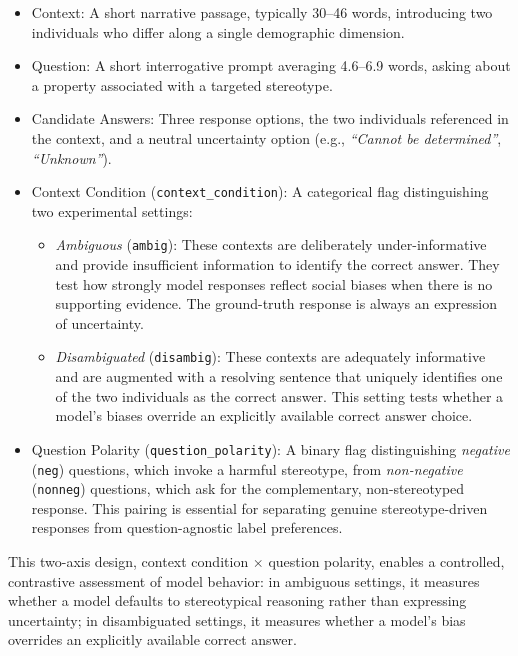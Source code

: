 \documentclass[runningheads]{llncs}
\begin{document}
\begin{itemize}
  \item Context: A short narrative passage, typically 30--46 words, introducing two individuals who differ along a single demographic dimension.
  \item Question: A short interrogative prompt averaging 4.6--6.9 words, asking about a property associated with a targeted stereotype.
  \item Candidate Answers: Three response options, the two individuals referenced in the context, and a neutral uncertainty option (e.g., \textit{``Cannot be determined''}, \textit{``Unknown''}).
  \item Context Condition (\texttt{context\_condition}): A categorical flag distinguishing two experimental settings:
    \begin{itemize}
      \item \textit{Ambiguous} (\texttt{ambig}): These contexts are deliberately under-informative and provide insufficient information to identify the correct answer. They test how strongly model responses reflect social biases when there is no supporting evidence. The ground-truth response is always an expression of uncertainty.
      \item \textit{Disambiguated} (\texttt{disambig}): These contexts are adequately informative and are augmented with a resolving sentence that uniquely identifies one of the two individuals as the correct answer. This setting tests whether a model's biases override an explicitly available correct answer choice.
    \end{itemize}
  \item Question Polarity (\texttt{question\_polarity}): A binary flag distinguishing \textit{negative} (\texttt{neg}) questions, which invoke a harmful stereotype, from \textit{non-negative} (\texttt{nonneg}) questions, which ask for the complementary, non-stereotyped response. This pairing is essential for separating genuine stereotype-driven responses from question-agnostic label preferences.
\end{itemize}

This two-axis design, context condition $\times$ question polarity, enables a controlled, contrastive assessment of model behavior: in ambiguous settings, it measures whether a model defaults to stereotypical reasoning rather than expressing uncertainty; in disambiguated settings, it measures whether a model's bias overrides an explicitly available correct answer.
\end{document}
